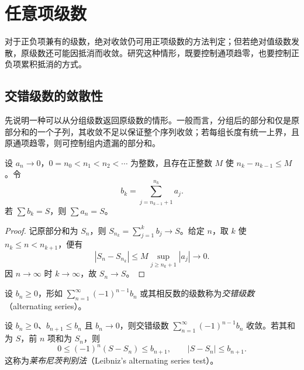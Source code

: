 \documentclass[UTF8,12pt,a4paper,fontset=fandol]{ctexbook}
\begin{document}
\section{任意项级数}
\label{sec:general-term-series}

对于正负项兼有的级数，绝对收敛仍可用正项级数的方法判定；但若绝对值级数发散，原级数还可能因抵消而收敛。研究这种情形，既要控制通项趋零，也要控制正负项累积抵消的方式。

\subsection{交错级数的敛散性}
\label{subsec:convergence-of-alternating-series}

先说明一种可以从分组级数返回原级数的情形。一般而言，分组后的部分和仅是原部分和的一个子列，其收敛不足以保证整个序列收敛；若每组长度有统一上界，且原通项趋零，则可控制组内遗漏的部分和。

\begin{theorem}[有界长度分组的逆向结论]
\label{thm:bounded-block-grouping-series}
设 $a_n\to0$，$0=n_0<n_1<n_2<\cdots$ 为整数，且存在正整数 $M$ 使 $n_k-n_{k-1}\leq M$。令
\[
    b_k=\sum_{j=n_{k-1}+1}^{n_k}a_j.
\]
若 $\sum b_k=S$，则 $\sum a_n=S$。
\end{theorem}

\begin{proof}
记原部分和为 $S_n$，则 $S_{n_k}=\sum_{j=1}^k b_j\to S$。给定 $n$，取 $k$ 使 $n_k\leq n<n_{k+1}$，便有
\[
    |S_n-S_{n_k}|
    \leq M\sup_{j\geq n_k+1}|a_j|\longrightarrow0.
\]
因 $n\to\infty$ 时 $k\to\infty$，故 $S_n\to S$。
\end{proof}

\begin{definition}
设 $b_n\geq0$，形如 $\sum_{n=1}^{\infty}(-1)^{n-1}b_n$ 或其相反数的级数称为\emph{交错级数}（alternating series）。
\end{definition}

\begin{theorem}[莱布尼茨判别法及余项估计]
\label{thm:leibniz-alternating-series-test}
设 $b_n\geq0$、$b_{n+1}\leq b_n$ 且 $b_n\to0$，则交错级数 $\sum_{n=1}^{\infty}(-1)^{n-1}b_n$ 收敛。若其和为 $S$，前 $n$ 项和为 $S_n$，则
\begin{equation}
    0\leq(-1)^n(S-S_n)\leq b_{n+1},
    \qquad |S-S_n|\leq b_{n+1}.
    \label{eq:leibniz-series-remainder}
\end{equation}
这称为\emph{莱布尼茨判别法}（Leibniz's alternating series test）。
\end{theorem}
\end{document}
